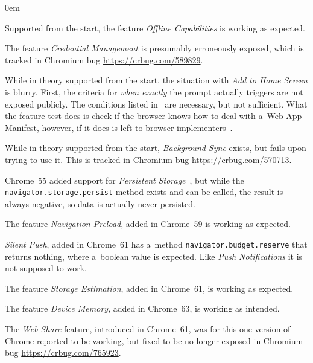 \documentclass[sigconf]{acmart}
\begin{document}
\begin{description}
  \itemsep0em 
  \item[Offline Capabilities] Supported from the start, the feature \emph{Offline Capabilities}
    is working as expected.
  \item[Credential Management] The feature \emph{Credential Management}
    is presumably erroneously exposed,
     which is tracked in Chromium bug \url{https://crbug.com/589829}.    
  \item[Add to Home Screen] While in theory supported from the start,
    the situation with \emph{Add to Home Screen} is blurry.
    First, the criteria for \emph{when exactly} the prompt actually triggers
    are not exposed publicly. The conditions listed in~\cite{kinlan2017a2hs} are necessary,
    but not sufficient.
    What the feature test does is check if the browser knows how to deal
    with a~Web App Manifest, however, if it does
    is left to browser implementers~\cite{caceres2017manifest}.
  \item[Background Sync] While in theory supported from the start,
    \emph{Background Sync} exists, but fails upon trying to use it.
    This is tracked in Chromium bug \url{https://crbug.com/570713}.
  \item[Persistent Storage] Chrome~55 added support for
     \emph{Persistent Storage}~\cite{vankesteren2018storage},
     but while the \texttt{navigator.storage.persist} method exists and can be called,
     the result is always negative, so data is actually never persisted.
  \item[Navigation Preload] The feature \emph{Navigation Preload}, added in Chrome~59
    is working as expected.
  \item[Silent Push] \emph{Silent Push}, added in Chrome~61 has a~method
    \texttt{navigator.budget.reserve} that returns nothing, where a~boolean value is expected.
    Like \emph{Push Notifications} it is not supposed to work.
  \item[Storage Estimation] The feature \emph{Storage Estimation}, added in Chrome~61,
    is working as expected.
  \item[Device Memory] The feature \emph{Device Memory}, added in Chrome~63, 
    is working as intended.
  \item[Web Share] The \emph{Web Share} feature, introduced in Chrome~61,
    was for this one version of Chrome reported to be working, but fixed
    to be no longer exposed in Chromium bug \url{https://crbug.com/765923}.
\end{description} 
\end{document}
